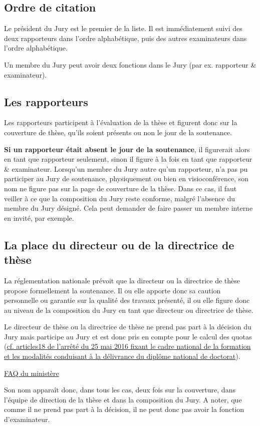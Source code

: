 \documentclass[french,12pt,a4paper]{book}
\begin{document}
\subsection{Ordre de citation}
Le président du Jury est le premier de la liste. Il est immédiatement suivi des deux rapporteurs dans l’ordre alphabétique, puis des autres examinateurs dans l’ordre alphabétique.\\ \par
Un membre du Jury peut avoir deux fonctions dans le Jury (par ex. rapporteur \& examinateur).
\subsection{Les rapporteurs}
Les rapporteurs participent à l’évaluation de la thèse et figurent donc sur la couverture de thèse, qu’ils soient présents ou non le jour de la soutenance.\\ \par 
\textbf{Si un rapporteur était absent le jour de la soutenance}, il figurerait alors en tant que rapporteur seulement, sinon il figure à la fois en tant que rapporteur \& examinateur.
Lorsqu’un membre du Jury autre qu’un rapporteur, n’a pas pu participer au Jury de soutenance, physiquement ou bien en visioconférence, son nom ne figure pas sur la page de couverture de la thèse. Dans ce cas, il faut veiller à ce que la composition du Jury reste conforme, malgré l’absence du membre du Jury désigné. Cela peut demander de faire passer un membre interne en invité, par exemple.
\subsection{La place du directeur ou de la directrice de thèse}
La réglementation nationale prévoit que la directeur ou la directrice de thèse propose formellement la soutenance. Il ou elle apporte donc sa caution personnelle ou garantie sur la qualité des travaux présenté, il ou elle figure donc au niveau de la composition du Jury en tant que directeur ou directrice de thèse.\\ \par
Le directeur de thèse ou la directrice de thèse ne prend pas part à la décision du Jury mais participe au Jury et est donc pris en compte pour le calcul des quotas (\href{https://www.legifrance.gouv.fr/affichTexte.do?cidTexte=JORFTEXT000032587086&dateTexte=20160902}{cf. articles18 de l’arrêté du 25 mai 2016 fixant le cadre national de la formation et les modalités conduisant à la délivrance du diplôme national de doctorat}).\\ \par
\href{https://www.enseignementsup-recherche.gouv.fr/cid111561/la-formation-doctorale-renovee-par-l-arrete-du-25-mai-2016.html}{FAQ du ministère}\\ \par
Son nom apparaît donc, dans tous les cas, deux fois sur la couverture, dans l’équipe de direction de la thèse et dans la composition du Jury. A noter, que comme il ne prend pas part à la décision, il ne peut donc pas avoir la fonction d’examinateur.
\end{document}
